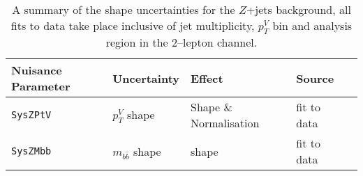 \begin{table}[!htb]
  \begin{tabular}{lllll}
    \toprule
    {\bfseries Nuisance Parameter} & Uncertainty & Effect & Source  \\
    \midrule
    \texttt{SysZPtV} & $p_T^V$ shape & Shape \& Normalisation &  fit to data \\
    \texttt{SysZMbb} & $m_{b\bar{b}}$ shape & shape 	& fit to data \\
    \bottomrule
  \end{tabular}
  \caption{A summary of the shape uncertainties for the $Z$+jets background, all
    fits to data take place inclusive of jet multiplicity, $p_T^V$ bin and
    analysis region in the 2--lepton channel.}
  \label{tab:zjets-shapes}
\end{table}